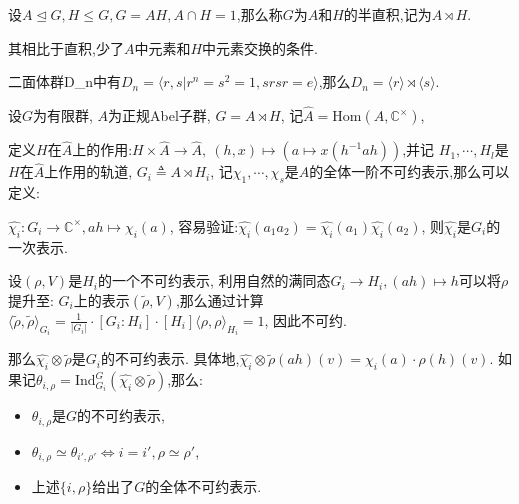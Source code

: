 
\begin{definition}[半直积]
    设$A \trianglelefteq G, H \leq G, G = AH, A\cap H = {1}$,那么称$G$为$A$和$H$的半直积,记为$A\rtimes H$.

    其相比于直积,少了$A$中元素和$H$中元素交换的条件.

\end{definition}

\begin{example}
    二面体群D_n中有$D_n = \langle r,s | r^n = s^2 = 1, srsr = e \rangle$,那么$D_n = \langle r \rangle \rtimes \langle s \rangle$.
\end{example}

\begin{theorem}
    设$G$为有限群, $A$为正规Abel子群, $G = A \rtimes H$, 记$\hat{A} = \mathrm{Hom}(A,\mathbb C ^{\times})$,
    
    定义$H$在$\hat{A}$上的作用:$H \times \hat A \to \hat A, \  (h,x) \mapsto (a \mapsto x(h^{-1} ah))$,并记
    $H_1, \cdots, H_l$是$H$在$\hat A$上作用的轨道,
    $G_i \triangleq  A \rtimes H_i$,
    记$\chi_1,\cdots, \chi_s$是$A$的全体一阶不可约表示,那么可以定义:

    $\hat{\chi_i}:G_i \to \mathbb C^{\times}, ah \mapsto \chi_i(a)$, 容易验证:$\hat{\chi_i}(a_1a_2)= \hat{\chi_i}(a_1)\hat{\chi_i}(a_2)$,  则$\hat{\chi_i}$是$G_i$的一次表示.
    
    设$(\rho,V)$是$H_i$的一个不可约表示, 利用自然的满同态$G_i \to H_i, (ah) \mapsto h$可以将$\rho$提升至:
    $G_i$上的表示$(\tilde{\rho}, V)$,那么通过计算$\langle \tilde{\rho}, \tilde{\rho}\rangle_{G_i} = \frac {1}{|G_i|} \cdot [G_i : H_i] \cdot [H_i] \langle \rho, \rho \rangle_{H_i} = 1$,
    因此不可约.

    那么$\hat{\chi_i} \otimes \tilde{\rho}$是$G_i$的不可约表示.
    具体地,$\hat{\chi_i} \otimes \tilde{\rho}(ah)(v)= \chi_i(a) \cdot \rho(h)(v)$.
    如果记$\theta_{i,\rho} = \mathrm{Ind}^{G}_{G_i}(\hat{\chi_i} \otimes \tilde{\rho})$,那么:

    \begin{itemize}
        \item $\theta_{i,\rho}$是$G$的不可约表示, 
        \item $\theta_{i,\rho} \simeq \theta_{i', \rho'} \Leftrightarrow i = i', \rho \simeq \rho'$,
        \item 上述$\{i,\rho\}$给出了$G$的全体不可约表示.
    \end{itemize}

\end{theorem}